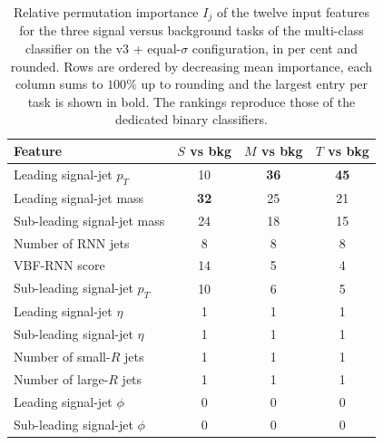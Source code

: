 \begin{table}[htbp]
  \centering
  \caption{Relative permutation importance $I_j$ of the twelve input features for the three signal versus background tasks of the multi-class classifier on the v3 + equal-$\sigma$ configuration, in per cent and rounded. Rows are ordered by decreasing mean importance, each column sums to $100\%$ up to rounding and the largest entry per task is shown in bold. The rankings reproduce those of the dedicated binary classifiers.}
  \label{tab:fr_rank_mc_bkg}
  \begin{tabular}{|l|c|c|c|}
    \hline
    \textbf{Feature} & \textbf{$S$ vs bkg} & \textbf{$M$ vs bkg} & \textbf{$T$ vs bkg} \\
    \hline
    Leading signal-jet $p_T$      & 10 & \textbf{36} & \textbf{45} \\
    Leading signal-jet mass       & \textbf{32} & 25 & 21 \\
    Sub-leading signal-jet mass   & 24 & 18 & 15 \\
    Number of RNN jets            & 8  & 8  & 8 \\
    VBF-RNN score                 & 14 & 5  & 4 \\
    Sub-leading signal-jet $p_T$  & 10 & 6  & 5 \\
    Leading signal-jet $\eta$     & 1  & 1  & 1 \\
    Sub-leading signal-jet $\eta$ & 1  & 1  & 1 \\
    Number of small-$R$ jets      & 1  & 1  & 1 \\
    Number of large-$R$ jets      & 1  & 1  & 1 \\
    Leading signal-jet $\phi$     & 0  & 0  & 0 \\
    Sub-leading signal-jet $\phi$ & 0  & 0  & 0 \\
    \hline
  \end{tabular}
\end{table}

